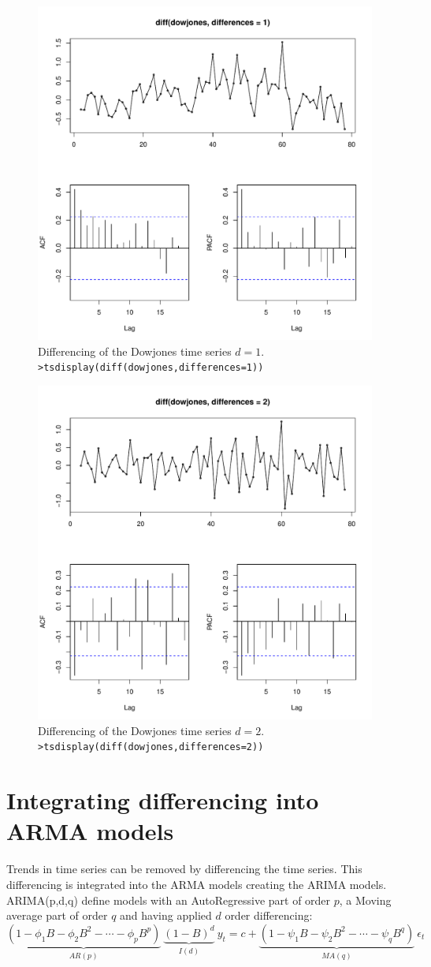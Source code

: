 \documentclass[a4paper,11pt,oneside,onecolumn]{book}
\begin{document}
\begin{figure}[!h]
\begin{center}
\includegraphics[width=.5\linewidth]{ dowjonesd1.pdf}
\caption{Differencing of the Dowjones time series $d=1$. \texttt{>tsdisplay(diff(dowjones,differences=1))}}\label{fig:diff:dowjones:d1}
\end{center}
\end{figure}

\begin{figure}[!h]
\begin{center}
\includegraphics[width=.5\linewidth]{ dowjonesd2.pdf}
\caption{Differencing of the  Dowjones time series $d=2$. \texttt{>tsdisplay(diff(dowjones,differences=2))}}\label{fig:diff:dowjones:d2}
\end{center}
\end{figure}




\section{Integrating differencing into ARMA models}
\label{sec:ARIMA}


\begin{definition}
Trends in time series can be  removed by  differencing the time series. This differencing is integrated into
the ARMA models creating the ARIMA models.
ARIMA(p,d,q) define models  with an AutoRegressive part of order $p$, a Moving average part of order $q$ and having applied $d$ order differencing:
$$ 
 \underbrace{(1-\phi_1 B-\phi_2 B^2-\cdots-\phi_{p} B^{p})}_{AR(p)}\ \underbrace{(1-B)^d}_{I(d)}\ y_t =c+ \underbrace{(1-\psi_1 B-\psi_2 B^2-\cdots-\psi_{q} B^{q})}_{MA(q)}\ \epsilon_t
$$

\end{definition}
\end{document}
